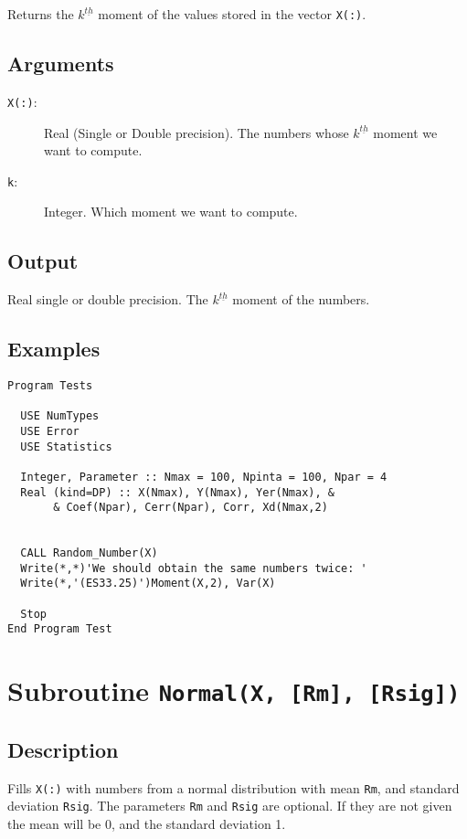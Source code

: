 Returns the $k^{\underline{th}}$ moment of the values stored in the
vector \texttt{X(:)}.

\subsection{Arguments}

\begin{description}
\item[\texttt{X(:)}:] Real (Single or Double precision). The numbers
  whose $k^{\underline{th}}$ moment we want to compute.
\item[\texttt{k}:] Integer. Which moment we want to compute.
\end{description}

\subsection{Output}

Real single or double precision. The $k^{\underline{th}}$ moment of
the numbers.

\subsection{Examples}

\begin{verbatim}
Program Tests

  USE NumTypes
  USE Error
  USE Statistics

  Integer, Parameter :: Nmax = 100, Npinta = 100, Npar = 4
  Real (kind=DP) :: X(Nmax), Y(Nmax), Yer(Nmax), &
       & Coef(Npar), Cerr(Npar), Corr, Xd(Nmax,2)


  CALL Random_Number(X)
  Write(*,*)'We should obtain the same numbers twice: '
  Write(*,'(ES33.25)')Moment(X,2), Var(X)

  Stop
End Program Test
\end{verbatim}

\section{Subroutine \texttt{Normal(X, [Rm], [Rsig])}}

\subsection{Description}

Fills \texttt{X(:)} with numbers from a normal distribution with mean
\texttt{Rm}, and standard deviation \texttt{Rsig}. The parameters
\texttt{Rm} and \texttt{Rsig} are optional. If they are not given the
mean will be 0, and the standard deviation 1.

